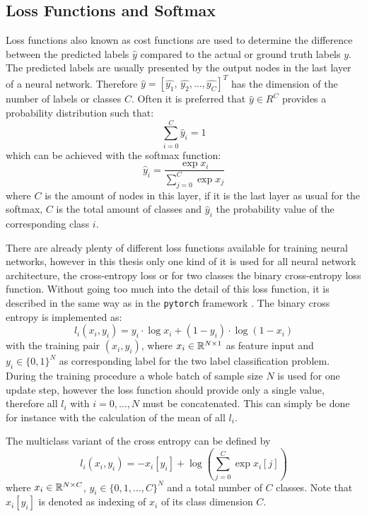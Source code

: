 
\subsection{Loss Functions and Softmax}
Loss functions also known as cost functions are used to determine the difference between the predicted labels $\hat{y}$ compared to the actual or ground truth labels $y$.
The predicted labels are usually presented by the output nodes in the last layer of a neural network.
Therefore $\hat{y} = [\hat{y_1}, \, \hat{y_2}, \dots, \hat{y_C}]^T$ has the dimension of the number of labels or classes $C$.
Often it is preferred that $\hat{y} \in R^C$ provides a probability distribution such that:
\begin{equation}
  \sum_{i=0}^C \hat{y}_i = 1
\end{equation}
which can be achieved with the softmax function:
\begin{equation}\label{eq:nn_theory_softmax}
  \hat{y}_i = \frac{\exp{x_i}}{\sum_{j=0}^{C}\exp{x_j}}
\end{equation}
where $C$ is the amount of nodes in this layer, if it is the last layer as usual for the softmax, $C$ is the total amount of classes and $\hat{y}_i$ the probability value of the corresponding class $i$.

There are already plenty of different loss functions available for training neural networks, however in this thesis only one kind of it is used for all neural network architecture, the cross-entropy loss or for two classes the binary cross-entropy loss function.
Without going too much into the detail of this loss function, it is described in the same way as in the \texttt{pytorch} framework \cite{Pytorch}.
The binary cross entropy is implemented as:
\begin{equation}
  l_i(x_i, y_i) = y_i \cdot \log x_i + (1 - y_i) \cdot \log (1 - x_i)
\end{equation}
with the training pair $(x_i, y_i)$, where $x_i \in \mathbb{R}^{N \times 1}$ as feature input and $y_i \in \{0, 1\}^N$ as corresponding label for the two label classification problem.
During the training procedure a whole batch of sample size $N$ is used for one update step, however the loss function should provide only a single value, therefore all $l_i$ with $i = 0, \dots, N$ must be concatenated.
This can simply be done for instance with the calculation of the mean of all $l_i$.

The multiclass variant of the cross entropy can be defined by
\begin{equation}
  l_i(x_i, y_i) = - x_i[y_i] + \log{\left( \sum_{j=0}^{C} \exp{x_i[j]} \right)}
\end{equation}
where $x_i \in \mathbb{R}^{N \times C}$, $y_i \in \{0, 1, \dots, C\}^N$ and a total number of $C$ classes.
Note that $x_i[y_i]$ is denoted as indexing of $x_i$ of its class dimension $C$. 


